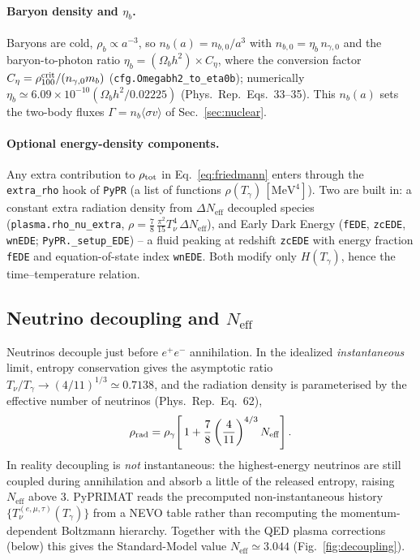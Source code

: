 \documentclass[11pt,a4paper]{article}
\newcommand{\Tg}{T_\gamma}
\newcommand{\Tnu}{T_\nu}
\newcommand{\Neff}{N_{\mathrm{eff}}}
\newcommand{\sigmav}{\langle\sigma v\rangle}
\newcommand{\code}[1]{\texttt{#1}}
\newcommand{\PR}{Phys.\ Rep.}
\begin{document}
\paragraph{Baryon density and $\eta_b$.}
Baryons are cold, $\rho_b\propto a^{-3}$, so $n_b(a)=n_{b,0}/a^3$ with
$n_{b,0}=\eta_b\,n_{\gamma,0}$ and the baryon-to-photon ratio
$\eta_b=(\Omega_bh^2)\times C_\eta$, where the conversion factor
$C_\eta=\rho^{\rm crit}_{100}/(n_{\gamma,0}m_b)$
(\code{cfg.Omegabh2\_to\_eta0b}); numerically $\eta_b\simeq6.09\times10^{-10}
(\Omega_bh^2/0.02225)$ (\PR\ Eqs.~33--35). This $n_b(a)$ sets the two-body
fluxes $\Gamma=n_b\sigmav$ of Sec.~\ref{sec:nuclear}.

\paragraph{Optional energy-density components.}
Any extra contribution to $\rho_{\rm tot}$ in Eq.~\eqref{eq:friedmann} enters
through the \code{extra\_rho} hook of \code{PyPR} (a list of functions
$\rho(\Tg)\,[\mathrm{MeV}^4]$). Two are built in: a constant extra radiation
density from $\Delta\Neff$ decoupled species (\code{plasma.rho\_nu\_extra},
$\rho=\tfrac78\,\tfrac{\pi^2}{15}\Tnu^4\,\Delta\Neff$), and Early Dark Energy
(\code{fEDE}, \code{zcEDE}, \code{wnEDE}; \code{PyPR.\_setup\_EDE}) -- a fluid
peaking at redshift \code{zcEDE} with energy fraction \code{fEDE} and
equation-of-state index \code{wnEDE}. Both modify only $H(\Tg)$, hence the
time--temperature relation.

\subsection{Neutrino decoupling and $\Neff$}
Neutrinos decouple just before $e^+e^-$ annihilation. In the idealized
\emph{instantaneous} limit, entropy conservation gives the asymptotic ratio
$\Tnu/\Tg \to (4/11)^{1/3}\simeq 0.7138$, and the radiation density is
parameterised by the effective number of neutrinos (\PR\ Eq.~62),
\begin{equation}
  \rho_{\rm rad} = \rho_\gamma\!\left[\,1
    + \frac{7}{8}\left(\frac{4}{11}\right)^{4/3}\Neff\right].
\label{eq:neff}
\end{equation}
In reality decoupling is \emph{not} instantaneous: the highest-energy neutrinos
are still coupled during annihilation and absorb a little of the released
entropy, raising $\Neff$ above 3. PyPRIMAT reads the precomputed
non-instantaneous history $\{\Tnu^{(e,\mu,\tau)}(\Tg)\}$ from a NEVO table rather
than recomputing the momentum-dependent Boltzmann hierarchy. Together with the
QED plasma corrections (below) this gives the Standard-Model value
$\Neff\simeq 3.044$ (Fig.~\ref{fig:decoupling}).
\end{document}
